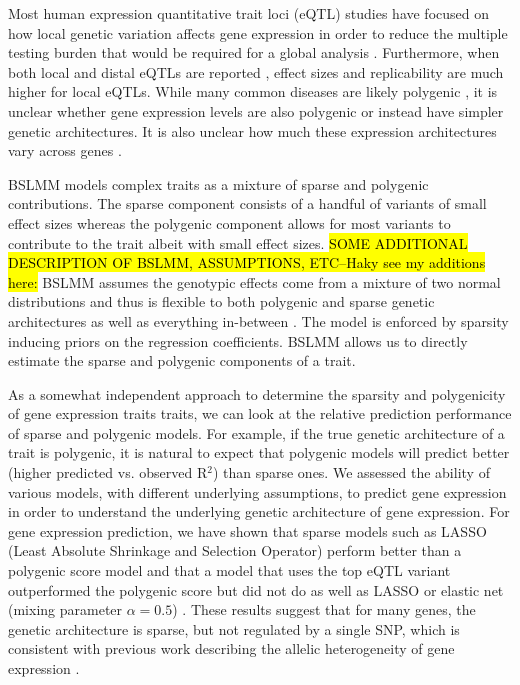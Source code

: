 \documentclass[10pt,letterpaper]{article}
\begin{document}
Most human expression quantitative trait loci (eQTL) studies have focused on how local genetic variation affects gene expression in order to reduce the multiple testing burden that would be required for a global analysis \cite{Albert_2015, Stranger_2012}. Furthermore, when both local and distal eQTLs are reported \cite{Stranger_2007,Innocenti_2011,Wright_2014}, effect sizes and replicability are much higher for local eQTLs. While many common diseases are likely polygenic \cite{Purcell_2009,Stahl_2012,Morris_2012}, it is unclear whether gene expression levels are also polygenic or instead have simpler genetic architectures. It is also unclear how much these expression architectures vary across genes \cite{Albert_2015}. 

BSLMM models complex traits as a mixture of sparse and polygenic contributions. The sparse component consists of a handful of variants of small effect sizes whereas the polygenic component allows for most variants to contribute to the trait albeit with small effect sizes.  \hl{SOME ADDITIONAL DESCRIPTION OF BSLMM, ASSUMPTIONS, ETC--Haky see my additions here: } BSLMM assumes the genotypic effects come from a mixture of two normal distributions and thus is flexible to both polygenic and sparse genetic architectures as well as everything in-between \cite{Zhou_2013}. The model is enforced by sparsity inducing priors on the
regression coefficients. BSLMM allows us to directly estimate the sparse and polygenic components of a trait.

As a somewhat independent approach to determine the sparsity and polygenicity of gene expression traits traits, we can look at the relative prediction performance of sparse and polygenic models. For example, if the true genetic architecture of a trait is polygenic, it is natural to expect that polygenic models will predict better (higher predicted vs. observed R$^2$) than sparse ones. We assessed the ability of various models, with different underlying assumptions, to predict gene expression in order to understand the underlying genetic architecture of gene expression. For gene expression prediction, we have shown that sparse models such as LASSO (Least Absolute Shrinkage and Selection Operator) perform better than a polygenic score model and that a model that uses the top eQTL variant outperformed the polygenic score but did not do as well as LASSO or elastic net (mixing parameter $\alpha=0.5$) \cite{Gamazon_2015}. These results suggest that for many genes, the genetic architecture is sparse, but not regulated by a single SNP, which is consistent with previous work describing the allelic heterogeneity of gene expression \cite{brown2013integrative,king2014genetic,zhang2011genetic}. 
\end{document}
